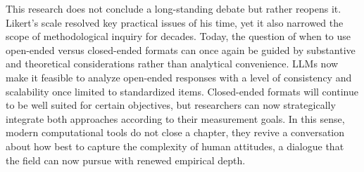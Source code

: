 \documentclass[
  journal=ram,
  manuscript=article-type,
  year=2025,
  volume=unpublished,
]{cup-journal}
\begin{document}
This research does not conclude a long-standing debate but rather reopens it.
Likert’s scale resolved key practical issues of his time, yet it also narrowed the scope of methodological inquiry for decades.
Today, the question of when to use open-ended versus closed-ended formats can once again be guided by substantive and theoretical considerations rather than analytical convenience.
LLMs now make it feasible to analyze open-ended responses with a level of consistency and scalability once limited to standardized items.
Closed-ended formats will continue to be well suited for certain objectives, but researchers can now strategically integrate both approaches according to their measurement goals.
In this sense, modern computational tools do not close a chapter, they revive a conversation about how best to capture the complexity of human attitudes, a dialogue that the field can now pursue with renewed empirical depth.

\printbibliography



\clearpage

\appendix


\end{document}
